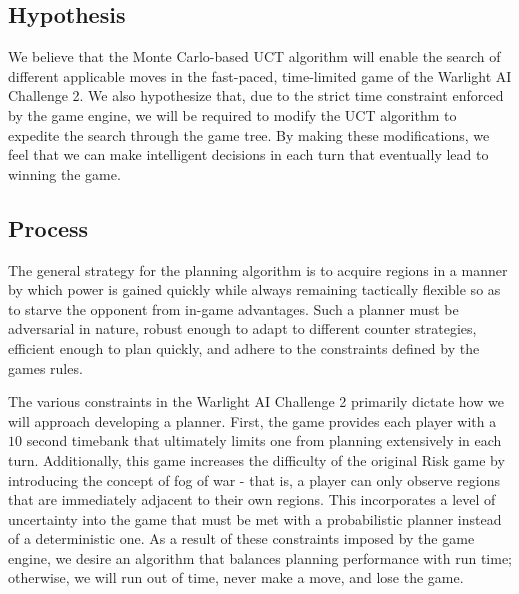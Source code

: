 \documentclass[a4paper,11pt]{article}
\begin{document}
\subsection{Hypothesis}\label{sec:hypothesis}
We believe that the Monte Carlo-based UCT algorithm will enable the search of different applicable moves in the fast-paced, time-limited game of the Warlight AI Challenge 2. We also hypothesize that, due to the strict time constraint enforced by the game engine, we will be required to modify the UCT algorithm to expedite the search through the game tree.  By making these modifications, we feel that we can make intelligent decisions in each turn that eventually lead to winning the game.

\subsection{Process}\label{sec:process}
The general strategy for the planning algorithm is to acquire regions in a manner by which power is gained quickly while always remaining tactically flexible so as to starve the opponent from in-game advantages. Such a planner must be adversarial in nature, robust enough to adapt to different counter strategies, efficient enough to plan quickly, and adhere to the constraints defined by the games rules.

The various constraints in the Warlight AI Challenge 2 primarily dictate how we will approach developing a planner. First, the game provides each player with a $10$ second timebank that ultimately limits one from planning extensively in each turn.  Additionally, this game increases the difficulty of the original Risk game by introducing the concept of fog of war - that is, a player can only observe regions that are immediately adjacent to their own regions. This incorporates a level of uncertainty into the game that must be met with a probabilistic planner instead of a deterministic one. As a result of these constraints imposed by the game engine, we desire an algorithm that balances planning performance with run time; otherwise, we will run out of time, never make a move, and lose the game. 
\end{document}
